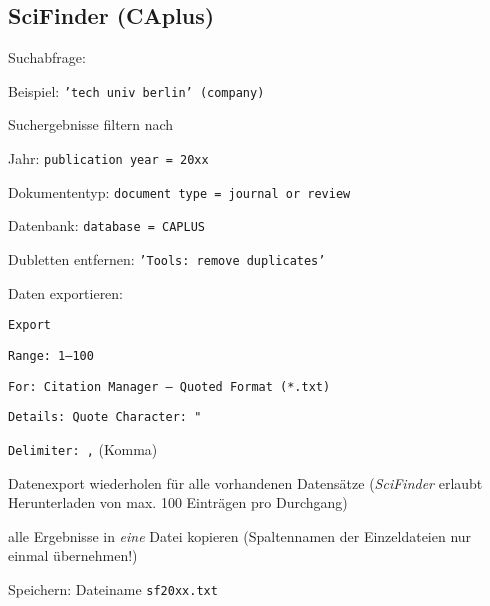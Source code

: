 \subsection*{SciFinder (CAplus)}
\begin{compactitem}
\item Suchabfrage:
	\begin{compactitem}
    \item Beispiel: \texttt{'tech univ berlin' (company)}
    \end{compactitem}
\item Suchergebnisse filtern nach
	\begin{compactitem}
    \item Jahr: \texttt{publication year = 20xx}
    \item Dokumententyp: \texttt{document type = journal or review}
    \item Datenbank: \texttt{database = CAPLUS}
    \end{compactitem}
\item Dubletten entfernen: \texttt{'Tools: remove duplicates'}
\item Daten exportieren: 
	\begin{compactitem}
    \item \texttt{Export}
    \item \texttt{Range: 1--100}
    \item \texttt{For: Citation Manager -- Quoted Format (*.txt)}
    \item \texttt{Details: Quote Character: "}
    \item \texttt{Delimiter: ,} (Komma)
    \end{compactitem}
\item Datenexport wiederholen für alle vorhandenen Datensätze (\textit{SciFinder} erlaubt Herunterladen von max. 100 Einträgen pro Durchgang)
\item alle Ergebnisse in \textit{eine} Datei kopieren (Spaltennamen der Einzeldateien nur einmal übernehmen!)
\item Speichern: Dateiname \texttt{sf20xx.txt}
\end{compactitem}

